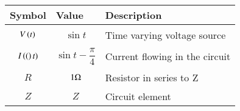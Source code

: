 \begin{tabular}{|p{2cm}|p{2.80cm}|p{2.70cm}|}
    \hline
    Symbol&Value&Description\\ \hline
    $$V\left(t\right)$$&$$\sin{t}$$&Time varying voltage source\\\hline
    $$I\left((\right)t)$$&$$\sin{t-\frac{\pi}{4}}$$&Current flowing in the circuit\\\hline
    $$R$$&$$1\ohm$$&Resistor in series to Z\\\hline
    $$Z$$&$$Z$$&Circuit element\\\hline
    \end{tabular}